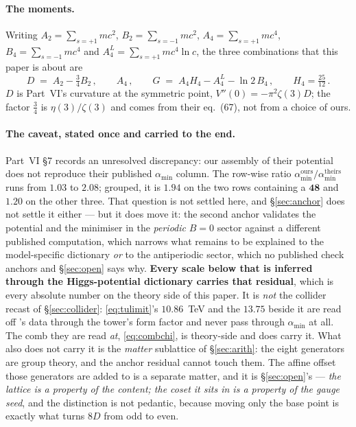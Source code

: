 \documentclass[11pt,a4paper]{article}
\newcommand{\rep}[1]{\mathbf{#1}}
\newcommand{\amin}{\alpha_{\min}}
\begin{document}
\paragraph{The moments.} Writing $A_2=\sum_{s=+1} m c^2$, $B_2=\sum_{s=-1} m c^2$,
$A_4=\sum_{s=+1} m c^4$, $B_4=\sum_{s=-1} m c^4$ and $A_4^{L}=\sum_{s=+1} m c^4\ln c$, the three
combinations that this paper is about are
\begin{equation}\label{eq:moments}
  D \;=\; A_2-\tfrac34 B_2\,,\qquad
  A_4\,,\qquad
  G \;=\; A_4 H_4 - A_4^{L} - \ln 2\,B_4\,,\qquad H_4=\tfrac{25}{12}\,.
\end{equation}
$D$ is Part~VI's curvature at the symmetric point, $V''(0)=-\pi^2\zeta(3)D$; the factor $\tfrac34$
is $\eta(3)/\zeta(3)$ and comes from their eq.~(67), not from a choice of ours.

\paragraph{The caveat, stated once and carried to the end.} Part~VI \S7 records an unresolved
discrepancy: our assembly of their potential does not reproduce their published $\amin$ column. The
row-wise ratio $\amin^{\text{ours}}/\amin^{\text{theirs}}$ runs from $1.03$ to $2.08$; grouped, it is
$1.94$ on the two rows containing a $\rep{48}$ and $1.20$ on the other three. That question is not
settled here, and \S\ref{sec:anchor} does not settle it either --- but it does move it: the second
anchor validates the potential and the minimiser in the \emph{periodic} $B=0$ sector against a
different published computation, which narrows what remains to be explained to the model-specific
dictionary \emph{or} to the antiperiodic sector, which no published check anchors and
\S\ref{sec:open} says why.
\textbf{Every scale below that is inferred through the Higgs-potential dictionary carries that
residual}, which is every absolute number on the theory side of this paper. It is \emph{not}
the collider recast of \S\ref{sec:collider}: \eqref{eq:tulimit}'s $10.86$~TeV and the $13.75$
beside it are read off \cite{CMSangular}'s data through the tower's form factor and never pass
through $\amin$ at all. The comb they are read \emph{at}, \eqref{eq:combchi}, is theory-side
and does carry it. What also does not carry it is the
\emph{matter} sublattice of \S\ref{sec:arith}: the eight generators are group theory, and the
anchor residual cannot touch them. The affine offset those generators are added to is a separate
matter, and it is \S\ref{sec:open}'s --- \emph{the lattice is a property of the content; the coset
it sits in is a property of the gauge seed}, and the distinction is not pedantic, because moving
only the base point is exactly what turns $8D$ from odd to even.
\end{document}

